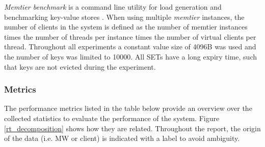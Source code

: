 \documentclass[report.tex]{subfiles}
\begin{document}
\emph{Memtier benchmark} is a command line utility for load generation and benchmarking key-value stores \cite{memtier}.
When using multiple \emph{memtier} instances, the number of clients in the system is defined as the number of memtier instances times the number of threads per instance times the number of virtual clients per thread. Throughout all experiments a constant value size of 4096B was used and the number of keys was limited to 10000. All SETs have a long expiry time, such that keys are not evicted during the experiment.

\subsubsection{Metrics}\label{metrics}

The performance metrics listed in the table below provide an overview over the collected statistics to evaluate the performance of the system. Figure \ref{rt_decomposition} shows how they are related.
Throughout the report, the origin of the data (i.e. MW or client) is indicated with a label to avoid ambiguity.
\end{document}
